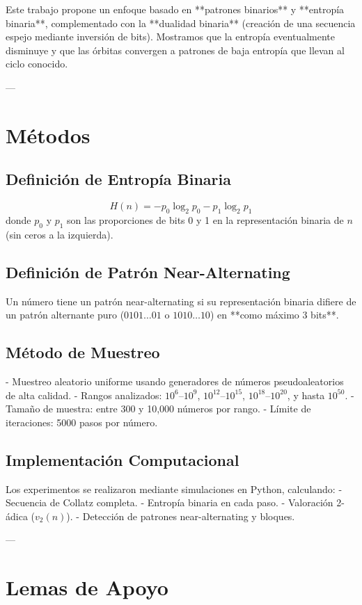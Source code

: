 \documentclass[11pt,a4paper]{article}
\begin{document}
Este trabajo propone un enfoque basado en **patrones binarios** y **entropía binaria**, complementado con la **dualidad binaria** (creación de una secuencia espejo mediante inversión de bits). Mostramos que la entropía eventualmente disminuye y que las órbitas convergen a patrones de baja entropía que llevan al ciclo conocido.

---

\section{Métodos}

\subsection{Definición de Entropía Binaria}
\[
H(n) = -p_0 \log_2 p_0 - p_1 \log_2 p_1
\]
donde \( p_0 \) y \( p_1 \) son las proporciones de bits 0 y 1 en la representación binaria de \( n \) (sin ceros a la izquierda).

\subsection{Definición de Patrón Near-Alternating}
Un número tiene un patrón near-alternating si su representación binaria difiere de un patrón alternante puro (\( 0101\dots01 \) o \( 1010\dots10 \)) en **como máximo 3 bits**.

\subsection{Método de Muestreo}
- Muestreo aleatorio uniforme usando generadores de números pseudoaleatorios de alta calidad.
- Rangos analizados: \(10^6\)–\(10^9\), \(10^{12}\)–\(10^{15}\), \(10^{18}\)–\(10^{20}\), y hasta \(10^{50}\).
- Tamaño de muestra: entre 300 y 10,000 números por rango.
- Límite de iteraciones: 5000 pasos por número.

\subsection{Implementación Computacional}
Los experimentos se realizaron mediante simulaciones en Python, calculando:
- Secuencia de Collatz completa.
- Entropía binaria en cada paso.
- Valoración 2-ádica (\( v_2(n) \)).
- Detección de patrones near-alternating y bloques.

---

\section{Lemas de Apoyo}
\end{document}
